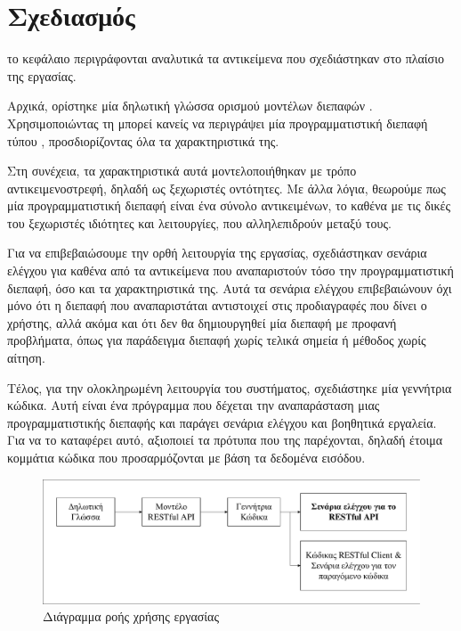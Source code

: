 \chapter{Σχεδιασμός}
το κεφάλαιο περιγράφονται αναλυτικά τα αντικείμενα που σχεδιάστηκαν στο πλαίσιο της εργασίας.

Αρχικά,
ορίστηκε μία δηλωτική γλώσσα ορισμού μοντέλων διεπαφών .
Χρησιμοποιώντας τη μπορεί κανείς να περιγράψει μία προγραμματιστική διεπαφή τύπου ,
προσδιορίζοντας όλα τα χαρακτηριστικά της.

Στη συνέχεια, τα χαρακτηριστικά αυτά μοντελοποιήθηκαν με τρόπο αντικειμενοστρεφή, δηλαδή ως ξεχωριστές οντότητες.
Με άλλα λόγια, θεωρούμε πως μία προγραμματιστική διεπαφή είναι ένα σύνολο αντικειμένων,
το καθένα με τις δικές του ξεχωριστές ιδιότητες και λειτουργίες,
που αλληλεπιδρούν μεταξύ τους. 

Για να επιβεβαιώσουμε την ορθή λειτουργία της εργασίας,
σχεδιάστηκαν σενάρια ελέγχου για καθένα από τα αντικείμενα που αναπαριστούν τόσο την προγραμματιστική διεπαφή, 
όσο και τα χαρακτηριστικά της. 
Αυτά τα σενάρια ελέγχου επιβεβαιώνουν όχι μόνο ότι η διεπαφή που αναπαριστάται αντιστοιχεί στις προδιαγραφές που δίνει ο χρήστης,
αλλά ακόμα και ότι δεν θα δημιουργηθεί μία διεπαφή με προφανή προβλήματα,
όπως για παράδειγμα διεπαφή χωρίς τελικά σημεία ή μέθοδος χωρίς αίτηση.

Τέλος, για την ολοκληρωμένη λειτουργία του συστήματος,
σχεδιάστηκε μία γεννήτρια κώδικα.
Αυτή είναι ένα πρόγραμμα που δέχεται την αναπαράσταση μιας προγραμματιστικής διεπαφής
και παράγει σενάρια ελέγχου και βοηθητικά εργαλεία.
Για να το καταφέρει αυτό, 
αξιοποιεί τα πρότυπα που της παρέχονται,
δηλαδή έτοιμα κομμάτια κώδικα 
που προσαρμόζονται με βάση τα δεδομένα εισόδου. 

\begin{figure}
    \centering
	\includegraphics[width=\textwidth]{figures/DSL.pdf} 
    \caption{Διάγραμμα ροής χρήσης εργασίας}
    \label{figure3.1}
\end{figure} 

